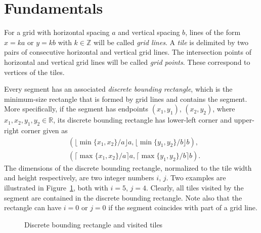 \documentclass[12pt, a4paper]{article}
\begin{document}
\section{Fundamentals}
\label{part: fund results}

For a grid with horizontal spacing $a$ and vertical spacing $b$, lines of the form $x = ka$ or $y = kb$ with $k \in \mathbb Z$ will be called \emph{grid lines}. A \emph{tile} is delimited by two pairs of consecutive horizontal and vertical grid lines. The intersection points of horizontal and vertical grid lines will be called \emph{grid points}. These correspond to vertices of the tiles.

Every segment has an associated \emph{discrete bounding rectangle}, which is the minimum-size rectangle that is formed by grid lines and contains the segment. More specifically, if the segment has endpoints $(x_1,y_1)$, $(x_2,y_2)$, where $x_1, x_2, y_1, y_2 \in \mathbb R$, its discrete bounding rectangle has lower-left corner and upper-right corner given as
\begin{align*}
& (\lfloor\min\{x_1, x_2\}/a\rfloor a, \lfloor\min\{y_1,y_2\}/b\rfloor b), \\
& (\lceil\max\{x_1, x_2\}/a \rceil a, \lceil\max\{y_1,y_2\}/b \rceil b).
\end{align*}
The dimensions of the discrete bounding rectangle, normalized to the tile width and height respectively, are two integer numbers $i$, $j$. Two examples are illustrated in Figure~\ref{fig: discrete bounding rectangle and touched tiles}, both with $i=5$, $j=4$. Clearly, all tiles visited by the segment are contained in the discrete bounding rectangle. Note also that the rectangle can have $i=0$ or $j=0$ if the segment coincides with part of a grid line.

\begin{figure}
\centering%
\hfill%
%
\caption{Discrete bounding rectangle and visited tiles
}%
\label{fig: discrete bounding rectangle and touched tiles}%
\end{figure}%
\end{document}
